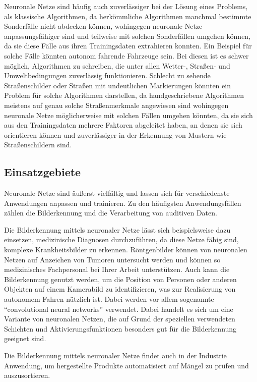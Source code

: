 Neuronale Netze sind häufig auch zuverlässiger bei der Lösung eines Problems, als klassische Algorithmen, da herkömmliche Algorithmen manchmal bestimmte Sonderfälle nicht abdecken können, wohingegen neuronale Netze anpassungsfähiger sind und teilweise mit solchen Sonderfällen umgehen können, da sie diese Fälle aus ihren Trainingsdaten extrahieren konnten.
Ein Beispiel für solche Fälle könnten autonom fahrende Fahrzeuge sein.
Bei diesen ist es schwer möglich, Algorithmen zu schreiben, die unter allen Wetter-, Straßen- und Umweltbedingungen zuverlässig funktionieren.
Schlecht zu sehende Straßenschilder oder Straßen mit undeutlichen Markierungen könnten ein Problem für solche Algorithmen darstellen, da handgeschriebene Algorithmen meistens auf genau solche Straßenmerkmale angewiesen sind wohingegen neuronale Netze möglicherweise mit solchen Fällen umgehen könnten, da sie sich aus den Trainingsdaten mehrere Faktoren abgeleitet haben, an denen sie sich orientieren können und zuverlässiger in der Erkennung von Mustern wie Straßenschildern sind.

\subsection{Einsatzgebiete}\label{subsec:einleitung_nn:einsatzgebiete}
Neuronale Netze sind äußerst vielfältig und lassen sich für verschiedenste Anwendungen anpassen und trainieren.
Zu den häufigsten Anwendungsfällen zählen die Bilderkennung und die Verarbeitung von auditiven Daten.

Die Bilderkennung mittels neuronaler Netze lässt sich beispielsweise dazu einsetzen, medizinische Diagnosen durchzuführen, da diese Netze fähig sind, komplexe Krankheitsbilder zu erkennen.
Röntgenbilder können von neuronalen Netzen auf Anzeichen von Tumoren untersucht werden und können so medizinisches Fachpersonal bei Ihrer Arbeit unterstützen.
Auch kann die Bilderkennung genutzt werden, um die Position von Personen oder anderen Objekten auf einem Kamerabild zu identifizieren, was zur Realisierung von autonomem Fahren nützlich ist.
Dabei werden vor allem sogenannte “convolutional neural networks” verwendet.
Dabei handelt es sich um eine Variante von neuronalen Netzen, die auf Grund der speziellen verwendeten Schichten und Aktivierungsfunktionen besonders gut für die Bilderkennung geeignet sind.

Die Bilderkennung mittels neuronaler Netze findet auch in der Industrie Anwendung, um hergestellte Produkte automatisiert auf Mängel zu prüfen und auszusortieren.


